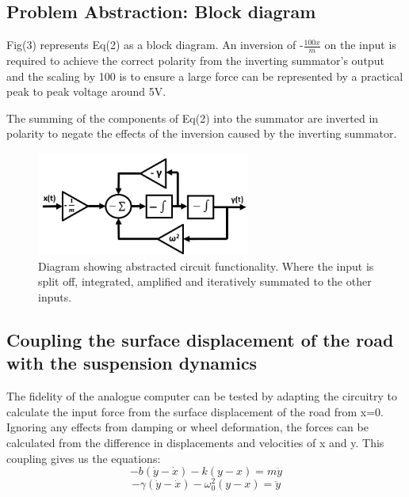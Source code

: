 \documentclass[journal]{Imperial_lab_report}
\begin{document}


\subsection{Problem Abstraction: Block diagram}
Fig(3) represents Eq(2) as a block diagram\cite{analoguecompanalysis}. An inversion of -$\frac{100x}{m}$ on the input is required to achieve the correct polarity from the inverting summator's output and the scaling by 100 is to ensure a large force can be represented by a practical peak to peak voltage around 5V. 

The summing of the components of Eq(2) into the summator are inverted in polarity to negate the effects of the inversion caused by the inverting summator.





\begin{figure}[h]
    \centering
    \includegraphics[width=7cm]{block diagram 2.png}
    \caption{Diagram showing abstracted circuit functionality. Where the input is split off, integrated, amplified and iteratively summated to the other inputs.}
    \label{fig:block normal}
\end{figure}

\subsection{Coupling the surface displacement of the road with the suspension dynamics}
The fidelity of the analogue computer can be tested by adapting the circuitry to calculate the input force from the surface displacement of the road from x=0. Ignoring any effects from damping or wheel deformation, the forces can be calculated from the difference in displacements and velocities of x and y. This coupling gives us the equations:
\begin{equation}
    - b(\dot{y} - \dot{x}) - k(y - x) = m\ddot{y}
\end{equation}
\begin{equation}
    - \gamma(\dot{y} - \dot{x}) - \omega_0^2(y - x)  = \ddot{y}
\end{equation}
\end{document}
